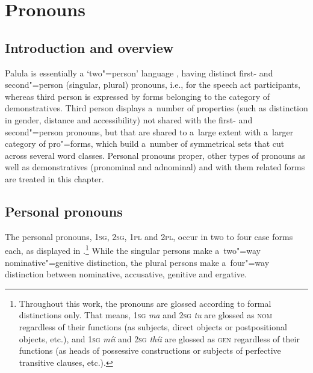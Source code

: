 \chapter{Pronouns}
\label{chap:5}

\section{Introduction and overview}
\label{sec:5-1}


Palula is essentially a `two"=person' language \citep[4--15]{bhat2004}, having distinct first- and second"=person (singular, plural) pronouns, i.e., for the speech act participants, whereas third person is expressed by forms belonging to the category of demonstratives. Third person displays a~number of properties (such as distinction in gender, distance and accessibility) not shared with the first- and second"=person pronouns, but that are shared to a~large extent with a~larger category of pro"=forms, which build a~number of symmetrical sets that cut across several word classes. Personal pronouns proper, other types of pronouns as well as demonstratives (pronominal and adnominal) and with them related forms are treated in this chapter.


\section{Personal pronouns}
\label{sec:5-2}

The personal pronouns, \textsc{1sg}, \textsc{2sg}, \textsc{1pl} and \textsc{2pl}, occur in two to four case forms each, as displayed in .\footnote{Throughout this work, the pronouns are glossed according to formal distinctions only. That means, \textsc{1sg} \textit{ma} and \textsc{2sg} \textit{tu} are glossed as \textsc{nom} regardless of their functions (as subjects, direct objects or postpositional objects, etc.), and \textsc{1sg} \textit{míi} and \textsc{2sg} \textit{thíi} are glossed as \textsc{gen} regardless of their functions (as heads of possessive constructions or subjects of perfective transitive clauses, etc.).} While the singular persons make a~two"=way nominative"=genitive distinction, the plural persons make a~four"=way distinction between nominative, accusative, genitive and ergative.


